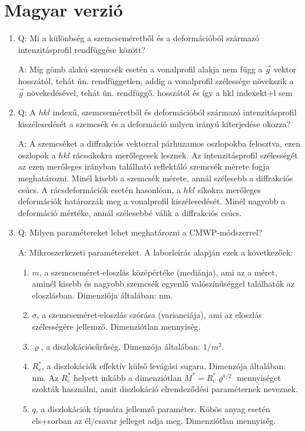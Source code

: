 \section{Magyar verzió}
\begin{enumerate}
	\item Q: Mi a különbség a szemcseméretből és a deformációból származó intenzitásprofil rendfüggése között?
    \begin{displayquote}
        A: Míg gömb alakú szemcsék esetén a  vonalprofil alakja nem függ a $\vec{g}$ vektor hosszától, tehát ún. rendfüggetlen, addig a  vonalprofil szélessége növekszik a $\vec{g}$ növekedésével, tehát ún. rendfüggő.
hosszától és így a hkl indexekt+l sem
    \end{displayquote}
    \item Q: A $hkl$ indexű, szemcseméretből és deformációból származó intenzitásprofil kiszélesedését a szemcsék és a deformáció milyen irányú kiterjedése okozza?
    \begin{displayquote}
        A: A szemcséket a diffrakciós vektorral párhuzamos oszlopokba felosztva, ezen oszlopok a $hkl$ rácssíkokra merőlegesek lesznek. Az intenzitásprofil szélességét az ezen merőleges irányban található reflektáló szemcsék mérete fogja meghatározni. Minél kisebb a szemcsék mérete, annál szélesebb a diffrakciós csúcs. A rácsdeformációk esetén hasonlóan, a $hkl$ síkokra merőleges deformációk határozzák meg a vonalprofil kiszélesedését. Minél nagyobb a deformáció mértéke, annál szélesebbé válik a diffrakciós csúcs.
    \end{displayquote}
    \item Q: Milyen paramétereket lehet meghatározni a CMWP-módszerrel?
    \begin{displayquote}
        A: Mikroszerkezeti paramétereket. A laborleírás alapján ezek a következőek:
        \begin{enumerate}
        \item $m$, a szemcseméret-eloszlás középértéke (mediánja), ami az a méret, aminél kisebb és nagyobb szemcsék egyenlő valószínűséggel találhatók az eloszlásban. Dimenziója általában: nm.
		\item $\sigma$, a szemcseméret-eloszlás szórása (varianciája), ami az eloszlás szélességére jellemző. Dimenziótlan mennyiség.
		\item $\varrho$, a diszlokációsűrűség. Dimenzója általában: $1/m^{2}$.
		\item $R_{e}^{\ast}$, a diszlokációk effektív külső levágási sugara. Dimenzója általában: nm. Az $R_{e}^{\ast}$ helyett inkább a dimenziótlan $M^{\ast} = R_{e}^{\ast} \varrho^{1/2}$  mennyiséget szokták használni, amit diszlokáció elrendeződési paraméternek neveznek.
		\item $q$, a diszlokációk típusára jellemző paraméter. Köbös anyag esetén els+sorban az él/csavar jelleget adja meg. Dimenziótlan mennyiség. 
        \end{enumerate}
    \end{displayquote}
\end{enumerate}